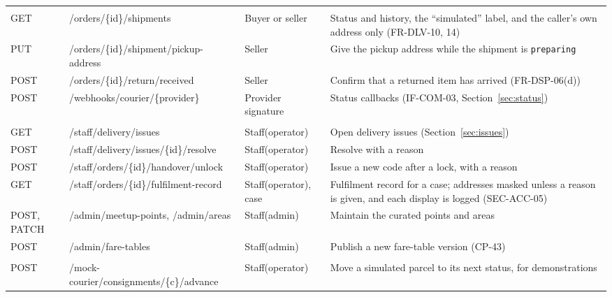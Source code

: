 \documentclass[11pt,a4paper]{article}
\begin{document}
{\begin{longtable}{@{}>{\ttfamily\raggedright\arraybackslash}p{1.55cm}>{\ttfamily\raggedright\arraybackslash}p{4.7cm}>{\raggedright\arraybackslash}p{2.5cm}>{\raggedright\arraybackslash}p{6.2cm}@{}}
\multicolumn{4}{@{}l}{\textbf{Courier}} \\
GET & /\allowbreak orders/\allowbreak \{id\}/\allowbreak shipments & Buyer or seller & Status and history, the ``simulated'' label, and the caller's own address only (FR-DLV-10, 14) \\
PUT & /\allowbreak orders/\allowbreak \{id\}/\allowbreak shipment/\allowbreak pickup-\allowbreak address & Seller & Give the pickup address while the shipment is \texttt{preparing} \\
POST & /\allowbreak orders/\allowbreak \{id\}/\allowbreak return/\allowbreak received & Seller & Confirm that a returned item has arrived (FR-DSP-06(d)) \\
POST & /\allowbreak webhooks/\allowbreak courier/\allowbreak \{provider\} & Provider signature & Status callbacks (IF-COM-03, Section~\ref{sec:status}) \\
\multicolumn{4}{@{}l}{\textbf{Staff}} \\
GET & /\allowbreak staff/\allowbreak delivery/\allowbreak issues & Staff(operator) & Open delivery issues (Section~\ref{sec:issues}) \\
POST & /\allowbreak staff/\allowbreak delivery/\allowbreak issues/\allowbreak \{id\}/\allowbreak resolve & Staff(operator) & Resolve with a reason \\
POST & /\allowbreak staff/\allowbreak orders/\allowbreak \{id\}/\allowbreak handover/\allowbreak unlock & Staff(operator) & Issue a new code after a lock, with a reason \\
GET & /\allowbreak staff/\allowbreak orders/\allowbreak \{id\}/\allowbreak fulfilment-\allowbreak record & Staff(operator), case & Fulfilment record for a case; addresses masked unless a reason is given, and each display is logged (SEC-ACC-05) \\
POST, PATCH & /\allowbreak admin/\allowbreak meetup-\allowbreak points, /\allowbreak admin/\allowbreak areas & Staff(admin) & Maintain the curated points and areas \\
POST & /\allowbreak admin/\allowbreak fare-\allowbreak tables & Staff(admin) & Publish a new fare-table version (CP-43) \\
\multicolumn{4}{@{}l}{\textbf{Mock courier} (sandbox builds only; Section~\ref{sec:mock})} \\
POST & /\allowbreak mock-\allowbreak courier/\allowbreak consignments/\allowbreak \{c\}/\allowbreak advance & Staff(operator) & Move a simulated parcel to its next status, for demonstrations \\
\bottomrule
\end{longtable}
}
\end{document}
